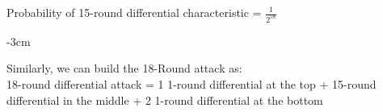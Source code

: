 \documentclass{transcrypto}
\begin{document}
	Probability of 15-round differential characteristic = $ \frac{1}{2^{58}} $
	\begin{center}
		\begin{table}[h]
			\addtolength{\leftskip} {-3cm}
			\addtolength{\rightskip}{-2cm}
			\caption{15-Round Differential Characteristic for PRIDE}
			\label{15-round}
		\end{table}
	\end{center}
	Similarly, we can build the 18-Round attack as:\\
	18-round differential attack = 1 1-round differential at the top + 15-round differential in the middle + 2 1-round differential at the bottom
\end{document}
